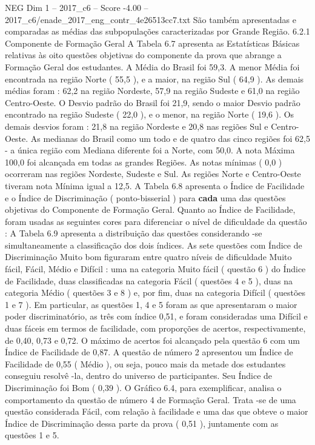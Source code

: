 \begin{textsample}{NEG Dim 1 – 2017\_c6 – Score -4.00 – 2017\_c6/enade\_2017\_eng\_contr\_4e26513cc7.txt}
São também apresentadas e comparadas as médias das subpopulações caracterizadas por Grande Região. 6.2.1 Componente de Formação Geral A Tabela 6.7 apresenta as Estatísticas Básicas relativas às oito questões objetivas do componente da prova que abrange a Formação Geral dos estudantes.
A Média do Brasil foi 59,3.
A menor Média foi encontrada na região Norte ( 55,5 ), e a maior, na região Sul ( 64,9 ).
As demais médias foram : 62,2 na região Nordeste, 57,9 na região Sudeste e 61,0 na região Centro-Oeste.
O Desvio padrão do Brasil foi 21,9, sendo o maior Desvio padrão encontrado na região Sudeste ( 22,0 ), e o menor, na região Norte ( 19,6 ).
Os demais desvios foram : 21,8 na região Nordeste e 20,8 nas regiões Sul e Centro-Oeste.
As medianas do Brasil como um todo e de quatro das cinco regiões foi 62,5 - a única região com Mediana diferente foi a Norte, com 50,0.
A nota Máxima 100,0 foi alcançada em todas as grandes Regiões.
As notas mínimas ( 0,0 ) ocorreram nas regiões Nordeste, Sudeste e Sul.
As regiões Norte e Centro-Oeste tiveram nota Mínima igual a 12,5.
A Tabela 6.8 apresenta o Índice de Facilidade e o Índice de Discriminação ( ponto-bisserial ) para \textbf{cada} uma das questões objetivas do Componente de Formação Geral.
Quanto ao Índice de Facilidade, foram usadas as seguintes cores para diferenciar o nível de dificuldade da questão : A Tabela 6.9 apresenta a distribuição das questões considerando -se simultaneamente a classificação dos dois índices.
As sete questões com Índice de Discriminação Muito bom figuraram entre quatro níveis de dificuldade Muito fácil, Fácil, Médio e Difícil : uma na categoria Muito fácil ( questão 6 ) do Índice de Facilidade, duas classificadas na categoria Fácil ( questões 4 e 5 ), duas na categoria Médio ( questões 3 e 8 ) e, por fim, duas na categoria Difícil ( questões 1 e 7 ).
Em particular, as questões 1, 4 e 5 foram as que apresentaram o maior poder discriminatório, as três com índice 0,51, e foram consideradas uma Difícil e duas fáceis em termos de facilidade, com proporções de acertos, respectivamente, de 0,40, 0,73 e 0,72.
O máximo de acertos foi alcançado pela questão 6 com um Índice de Facilidade de 0,87.
A questão de número 2 apresentou um Índice de Facilidade de 0,55 ( Médio ), ou seja, pouco mais da metade dos estudantes conseguiu resolvê -la, dentro do universo de participantes.
Seu Índice de Discriminação foi Bom ( 0,39 ).
O Gráfico 6.4, para exemplificar, analisa o comportamento da questão de número 4 de Formação Geral.
Trata -se de uma questão considerada Fácil, com relação à facilidade e uma das que obteve o maior Índice de Discriminação dessa parte da prova ( 0,51 ), juntamente com as questões 1 e 5.

\end{textsample}
